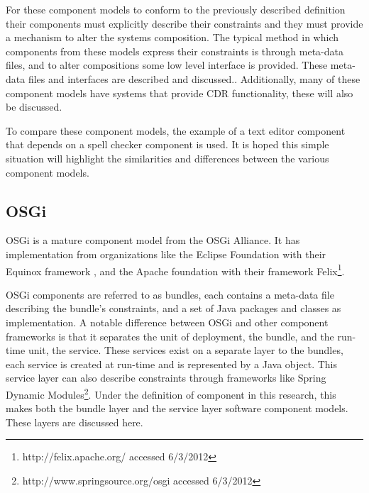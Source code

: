 For these component models to conform to the previously described definition
their components must explicitly describe their constraints and they must provide a mechanism to alter the systems composition.
The typical method in which components from these models express their constraints is through meta-data files,
and to alter compositions some low level interface is provided.
These meta-data files and interfaces are described and discussed..
Additionally, many of these component models have systems that provide CDR functionality, these will also be discussed.

To compare these component models, the example of a text editor component that depends on a spell checker component is used.
It is hoped this simple situation will highlight the similarities and differences between the various component models.

\subsection{OSGi}
OSGi is a mature component model from the OSGi Alliance.
It has implementation from organizations like the Eclipse Foundation with their Equinox framework \citep{mcaffer2010osgi}, 
and the Apache foundation with their framework Felix\footnote{http://felix.apache.org/ accessed 6/3/2012}.

OSGi components are referred to as bundles, each contains a meta-data file describing the bundle's constraints, and a set of Java packages and classes as implementation.
A notable difference between OSGi and other component frameworks is that it separates the unit of deployment, the bundle, and the run-time unit, the service.
These services exist on a separate layer to the bundles, each service is created at run-time and is represented by a Java object.
This service layer can also describe constraints through frameworks like Spring Dynamic Modules\footnote{http://www.springsource.org/osgi accessed 6/3/2012}.
Under the definition of component in this research, this makes both the bundle layer and the service layer software component models.
These layers are discussed here.

